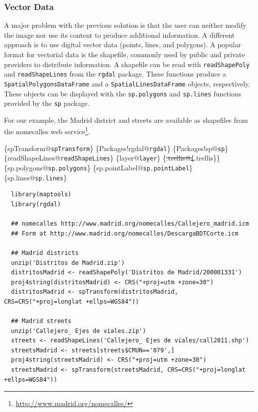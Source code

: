 \subsubsection{Vector Data}
\label{sec:org44b86d4}
A major problem with the previous solution is that the user can
neither modify the image nor use its content to produce additional
information.  A different approach is to use digital vector data
(points, lines, and polygons). A popular format for vectorial data is
the shapefile, commonly used by public and private providers to
distribute information. A shapefile can be read with \texttt{readShapePoly}
and \texttt{readShapeLines} from the \texttt{rgdal} package. These functions produce
a \texttt{SpatialPolygonsDataFrame} and a \texttt{SpatialLinesDataFrame} objects,
respectively. These objects can be displayed with the \texttt{sp.polygons}
and \texttt{sp.lines} functions provided by the \texttt{sp} package.

For our example, the Madrid district and streets are available as
shapefiles from the nomecalles web service\footnote{\url{http://www.madrid.org/nomecalles/}}.

\begin{LaTeX}
\index\{spTransform@\texttt{spTransform}\}
\index\{Packages!rgdal@\texttt{rgdal}\}
\index\{Packages!sp@\texttt{sp}\}
\index\{readShapeLines@\texttt{readShapeLines}\}
\index\{layer@\texttt{layer}\}
\index\{\sout{.trellis@\texttt\{}.trellis\}\}
\index\{sp.polygons@\texttt{sp.polygons}\}
\index\{sp.pointLabel@\texttt{sp.pointLabel}\}
\index\{sp.lines@\texttt{sp.lines}\}
\end{LaTeX}

\lstset{language=r,label= ,caption= ,captionpos=b,numbers=none}
\begin{lstlisting}
  library(maptools)
  library(rgdal)
    
  ## nomecalles http://www.madrid.org/nomecalles/Callejero_madrid.icm
  ## Form at http://www.madrid.org/nomecalles/DescargaBDTCorte.icm
  
  ## Madrid districts
  unzip('Distritos de Madrid.zip')
  distritosMadrid <- readShapePoly('Distritos de Madrid/200001331')
  proj4string(distritosMadrid) <- CRS("+proj=utm +zone=30")
  distritosMadrid <- spTransform(distritosMadrid, CRS=CRS("+proj=longlat +ellps=WGS84"))
  
  ## Madrid streets
  unzip('Callejero_ Ejes de viales.zip')
  streets <- readShapeLines('Callejero_ Ejes de viales/call2011.shp')
  streetsMadrid <- streets[streets$CMUN=='079',]
  proj4string(streetsMadrid) <- CRS("+proj=utm +zone=30")
  streetsMadrid <- spTransform(streetsMadrid, CRS=CRS("+proj=longlat +ellps=WGS84"))
\end{lstlisting}


